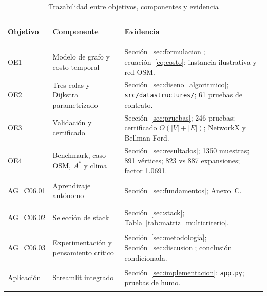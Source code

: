 \begin{table}[H]
    \centering
    \fontsize{9}{11}\selectfont
    \renewcommand{\arraystretch}{1.15}
    \caption{Trazabilidad entre objetivos, componentes y evidencia}
    \label{tab:matriz_trazabilidad}
    \begin{tabularx}{\textwidth}{@{}>{\bfseries\raggedright\arraybackslash}p{2.6cm} >{\raggedright\arraybackslash}p{4.7cm} >{\raggedright\arraybackslash}X@{}}
        \toprule
        \textbf{Objetivo} & \textbf{Componente} & \textbf{Evidencia} \\
        \midrule
        OE1 & Modelo de grafo y costo temporal & Sección~\ref{sec:formulacion}; ecuación~\eqref{eq:costo}; instancia ilustrativa y red OSM. \\
        OE2 & Tres colas y Dijkstra parametrizado & Sección~\ref{sec:diseno_algoritmico}; \texttt{src/datastructures/}; 61 pruebas de contrato. \\
        OE3 & Validación y certificado & Sección~\ref{sec:pruebas}; 246 pruebas; certificado $O(|V|+|E|)$; NetworkX y Bellman-Ford. \\
        OE4 & Benchmark, caso OSM, $A^*$ y clima & Sección~\ref{sec:resultados}; 1350 muestras; 891 vértices; 823 vs 887 expansiones; factor 1.0691. \\
        AG\_C06.01 & Aprendizaje autónomo & Sección~\ref{sec:fundamentos}; Anexo~C. \\
        AG\_C06.02 & Selección de stack & Sección~\ref{sec:stack}; Tabla~\ref{tab:matriz_multicriterio}. \\
        AG\_C06.03 & Experimentación y pensamiento crítico & Sección~\ref{sec:metodologia}; Sección~\ref{sec:discusion}; conclusión condicionada. \\
        Aplicación & Streamlit integrado & Sección~\ref{sec:implementacion}; \texttt{app.py}; pruebas de humo. \\
        \bottomrule
    \end{tabularx}
\end{table}

